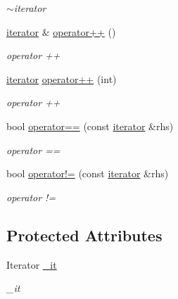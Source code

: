 \begin{DoxyCompactItemize}
\begin{DoxyCompactList}\small\item\em $\sim$iterator \end{DoxyCompactList}\item 
\hyperlink{classformat_1_1value_1_1iterator}{iterator} \& \hyperlink{classformat_1_1value_1_1iterator_acc2de73af4df5a286d946b3808b11f55}{operator++} ()
\begin{DoxyCompactList}\small\item\em operator ++ \end{DoxyCompactList}\item 
\hyperlink{classformat_1_1value_1_1iterator}{iterator} \hyperlink{classformat_1_1value_1_1iterator_a5808bd24b5f0a29f08a79e816ccf0be8}{operator++} (int)
\begin{DoxyCompactList}\small\item\em operator ++ \end{DoxyCompactList}\item 
bool \hyperlink{classformat_1_1value_1_1iterator_aff47683163af5878a754a35a6f342e35}{operator==} (const \hyperlink{classformat_1_1value_1_1iterator}{iterator} \&rhs)
\begin{DoxyCompactList}\small\item\em operator == \end{DoxyCompactList}\item 
bool \hyperlink{classformat_1_1value_1_1iterator_a661669d9b3c4af651df0520e8c580eab}{operator!=} (const \hyperlink{classformat_1_1value_1_1iterator}{iterator} \&rhs)
\begin{DoxyCompactList}\small\item\em operator != \end{DoxyCompactList}\end{DoxyCompactItemize}
\subsection*{Protected Attributes}
\begin{DoxyCompactItemize}
\item 
Iterator \hyperlink{classformat_1_1value_1_1iterator_a5111b2fefd001383ed6a026f04fb47b9}{\+\_\+it}\hypertarget{classformat_1_1value_1_1iterator_a5111b2fefd001383ed6a026f04fb47b9}{}\label{classformat_1_1value_1_1iterator_a5111b2fefd001383ed6a026f04fb47b9}

\begin{DoxyCompactList}\small\item\em \+\_\+it \end{DoxyCompactList}\end{DoxyCompactItemize}


